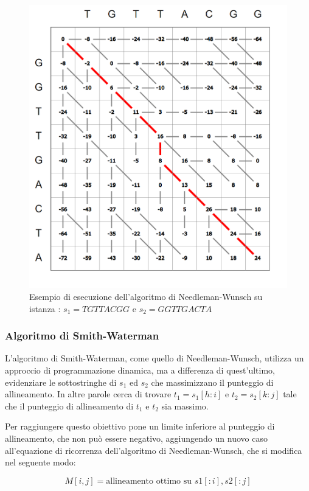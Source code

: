 \begin{figure}[ht]
    \centering
    \includegraphics[scale=0.45]{images/esempio nw.PNG}
    \caption{Esempio di esecuzione dell'algoritmo di Needleman-Wunsch su istanza : $s_1=TGTTACGG$ e $s_2=GGTTGACTA$}
    \label{fig:nw}
\end{figure}

\subsubsection{Algoritmo di Smith-Waterman}
L'algoritmo di Smith-Waterman, come quello di Needleman-Wunsch, utilizza un approccio di programmazione dinamica, ma a differenza di quest'ultimo, evidenziare le sottostringhe di $s_1$ ed $s_2$ che massimizzano il punteggio di allineamento. In altre parole cerca di trovare $t_1=s_1[h:i]$ e $t_2=s_2[k:j]$ tale che il punteggio di allineamento di $t_1$ e $t_2$ sia massimo.

Per raggiungere questo obiettivo pone un limite inferiore al punteggio di allineamento, che non può essere negativo, aggiungendo un nuovo caso all'equazione di ricorrenza dell'algoritmo di Needleman-Wunsch, che si modifica nel seguente modo:

\begin{equation*}
    M[i, j] = \textrm{allineamento  ottimo  su }  s1[:i],  s2[:j]
\end{equation*}

